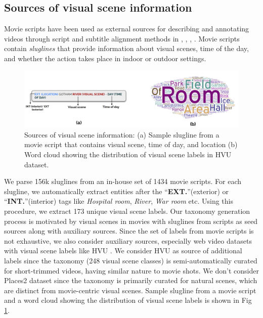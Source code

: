 \subsection{Sources of visual scene information}
Movie scripts have been used as external sources for describing and annotating videos through script and subtitle alignment methods in \cite{10.1007/978-3-540-88693-8_12}, \cite{Everingham2006HelloMN}, \cite{Laptevactionscvpr}, \cite{Rohrbach2015ADF}. Movie scripts contain \textit{sluglines} that provide information about visual scenes, time of the day, and whether the action takes place in indoor or outdoor settings.

\begin{figure}[!h]
 \centering
  \includegraphics[width=\linewidth]{figures/sources_of_information_visual_scene_taxonomy.png}
  \caption{Sources of visual scene information: (a) Sample slugline from a movie script that contains visual scene, time of day, and location (b) Word cloud showing the distribution of visual scene labels in HVU \cite{diba_large_2020} dataset.}
  \label{sources of information}
\end{figure}

We parse 156k sluglines from an in-house set of 1434 movie scripts. For each slugline, we automatically extract entities after the ``\textbf{EXT.}''(exterior) or ``\textbf{INT.}''(interior) tags like \textit{Hospital room}, \textit{River}, \textit{War room} etc.
Using this procedure, we extract 173 unique visual scene labels. Our taxonomy generation process is motivated by visual scenes in movies with sluglines from scripts as seed sources along with auxiliary sources.
Since the set of labels from movie scripts is not exhaustive, we also consider auxiliary sources, especially web video datasets with visual scene labels like HVU \cite{diba_large_2020}. We consider HVU as source of additional labels since the taxonomy (248 visual scene classes) is semi-automatically curated for short-trimmed videos, having similar nature to movie shots. We don’t consider Places2 \cite{zhou2017places} dataset since the taxonomy is primarily curated for natural
scenes, which are distinct from movie-centric visual scenes. Sample slugline from a movie script and a word cloud showing the distribution of visual scene labels is shown in Fig \ref{sources of information}.
%

